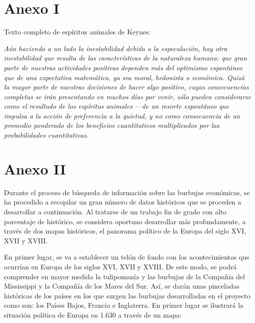 \chapter{Anexo I}

Texto completo de espíritus animales de Keynes:

\emph{Aún haciendo a un lado la inestabilidad debida a la especulación, hay otra inestabilidad que resulta de las características de la naturaleza humana: que gran parte de nuestras actividades positivas dependen más del optimismo espontáneo que de una expectativa matemática, ya sea moral, hedonista o económica. Quizá la mayor parte de nuestras decisiones de hacer algo positivo, cuyas consecuencias completas se irán presentando en muchos días por venir, sólo pueden considerarse como el resultado de los espíritus animales —de un resorte espontáneo que impulsa a la acción de preferencia a la quietud, y no como consecuencia de un promedio ponderado de los beneficios cuantitativos multiplicados por las probabilidades cuantitativas}.

\chapter{Anexo II}

Durante el proceso de búsqueda de información sobre las burbujas económicas, se ha procedido a recopilar un gran número de datos históricos que se proceden a desarrollar a continuación. Al tratarse de un trabajo fin de grado con alto porcentaje de histórico, se considera oportuno desarrollar más profundamente, a través de dos mapas históricos, el panorama político de la Europa del siglo XVI, XVII y XVIII. 

En primer lugar, se va a establecer un telón de fondo con los acontecimientos que ocurrían en Europa de los siglos XVI, XVII y XVIII. De este modo, se podrá comprender en mayor medida la tulipomanía y las burbujas de la Compañia del Mississippi y la Compañía de los Mares del Sur. Así, se darán unas pinceladas históricas de los países en los que surgen las burbujas desarrolladas en el proyecto como son: los Países Bajos, Francia e Inglaterra.
En primer lugar se ilustrará la situación política de Europa en 1.630 a través de un mapa:

